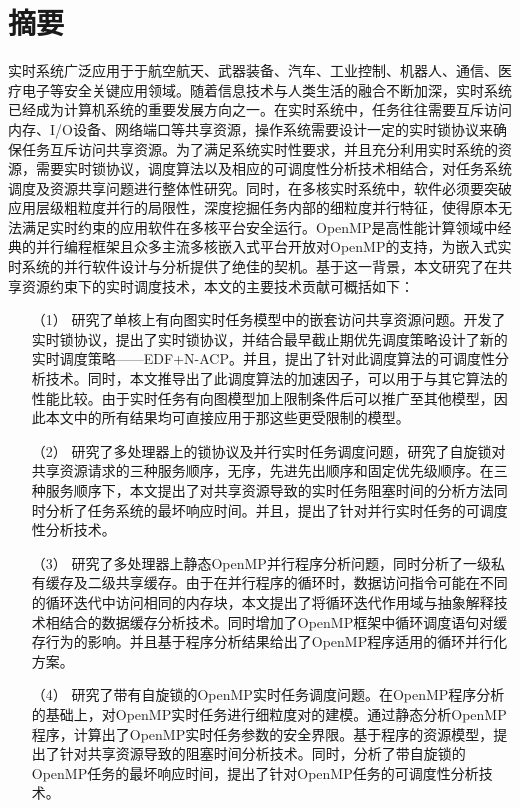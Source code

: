 \chapter{摘\quad 要}%
\linespread{1.5}

实时系统广泛应用于于航空航天、武器装备、汽车、工业控制、机器人、通信、医疗电子等安全关键应用领域。随着信息技术与人类生活的融合不断加深，实时系统已经成为计算机系统的重要发展方向之一。在实时系统中，任务往往需要互斥访问内存、I/O设备、网络端口等共享资源，操作系统需要设计一定的实时锁协议来确保任务互斥访问共享资源。为了满足系统实时性要求，并且充分利用实时系统的资源，需要实时锁协议，调度算法以及相应的可调度性分析技术相结合，对任务系统调度及资源共享问题进行整体性研究。同时，在多核实时系统中，软件必须要突破应用层级粗粒度并行的局限性，深度挖掘任务内部的细粒度并行特征，使得原本无法满足实时约束的应用软件在多核平台安全运行。OpenMP是高性能计算领域中经典的并行编程框架且众多主流多核嵌入式平台开放对OpenMP的支持，为嵌入式实时系统的并行软件设计与分析提供了绝佳的契机。基于这一背景，本文研究了在共享资源约束下的实时调度技术，本文的主要技术贡献可概括如下：

\begin{itemize}
    \item [（1）]研究了单核上有向图实时任务模型中的嵌套访问共享资源问题。开发了实时锁协议，提出了实时锁协议，并结合最早截止期优先调度策略设计了新的实时调度策略——EDF+N-ACP。并且，提出了针对此调度算法的可调度性分析技术。同时，本文推导出了此调度算法的加速因子，可以用于与其它算法的性能比较。由于实时任务有向图模型加上限制条件后可以推广至其他模型，因此本文中的所有结果均可直接应用于那这些更受限制的模型。
    \item [（2）]研究了多处理器上的锁协议及并行实时任务调度问题，研究了自旋锁对共享资源请求的三种服务顺序，无序，先进先出顺序和固定优先级顺序。在三种服务顺序下，本文提出了对共享资源导致的实时任务阻塞时间的分析方法同时分析了任务系统的最坏响应时间。并且，提出了针对并行实时任务的可调度性分析技术。
    \item [（3）]研究了多处理器上静态OpenMP并行程序分析问题，同时分析了一级私有缓存及二级共享缓存。由于在并行程序的循环时，数据访问指令可能在不同的循环迭代中访问相同的内存块，本文提出了将循环迭代作用域与抽象解释技术相结合的数据缓存分析技术。同时增加了OpenMP框架中循环调度语句对缓存行为的影响。并且基于程序分析结果给出了OpenMP程序适用的循环并行化方案。
    \item [（4）]研究了带有自旋锁的OpenMP实时任务调度问题。在OpenMP程序分析的基础上，对OpenMP实时任务进行细粒度对的建模。通过静态分析OpenMP程序，计算出了OpenMP实时任务参数的安全界限。基于程序的资源模型，提出了针对共享资源导致的阻塞时间分析技术。同时，分析了带自旋锁的OpenMP任务的最坏响应时间，提出了针对OpenMP任务的可调度性分析技术。
\end{itemize}

